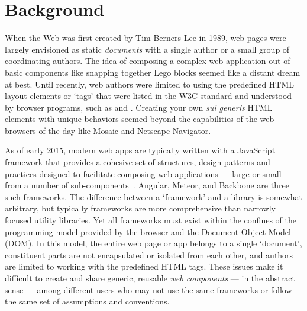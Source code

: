 \chapter{Background}
%
\label{ch:background}

When the Web was first created by Tim Berners-Lee in 1989, web pages were largely envisioned as static \textit{documents} with a single author or a small group of coordinating authors. 
The idea of composing a complex web application out of basic components like snapping together Lego blocks seemed like a distant dream at best.
Until recently, web authors were limited to using the predefined HTML layout elements or `tags' that were listed in the W3C standard and understood by browser programs, such as  and . 
Creating your own \textit{sui generis} HTML elements with unique behaviors seemed beyond the capabilities of the web browsers of the day like Mosaic
and Netscape Navigator.

As of early 2015, modern web apps are typically written with a JavaScript framework that provides a cohesive set of structures, design patterns and practices designed to facilitate composing web applications 
--- large or small --- 
from a number of sub-components~\cite{dickey2014}.
Angular, Meteor, and Backbone are three such frameworks.
The difference between a `framework' and a library is somewhat arbitrary, but typically frameworks are more comprehensive than narrowly focused utility libraries.
Yet all frameworks must exist within the confines of the programming model provided by the browser and the Document Object Model (DOM). 
In this model, the entire web page or app belongs to a single `document', constituent parts are not encapsulated or isolated from each other, and authors are limited to working with the predefined HTML tags.
These issues make it difficult to create and share generic, reusable \textit{web components} 
--- in the abstract sense --- 
among different users who may not use the same frameworks or follow the same set of assumptions and conventions.

